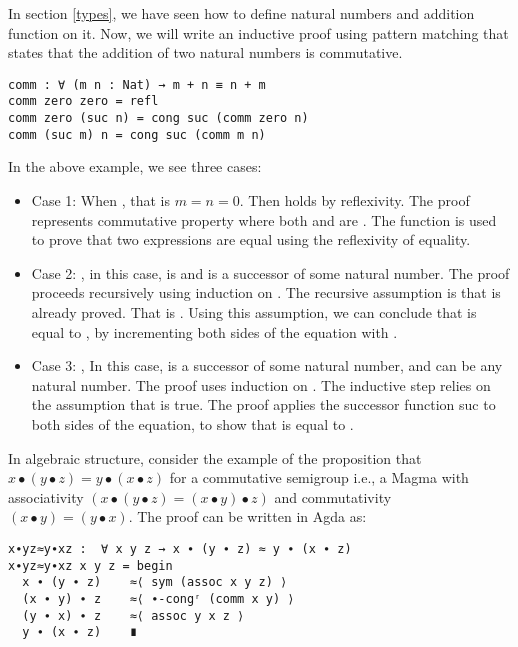 In section \ref{types}, we have seen how to define natural numbers and addition
function on it. Now, we will write an inductive proof using pattern matching
that states that the addition of two natural numbers is commutative.

\begin{verbatim}
comm : ∀ (m n : Nat) → m + n ≡ n + m
comm zero zero = refl
comm zero (suc n) = cong suc (comm zero n)
comm (suc m) n = cong suc (comm m n)
\end{verbatim}

In the above example, we see three cases:
\begin{itemize}
  \item Case 1: When , that is $m = n = 0$. Then
 holds by reflexivity. The proof  represents commutative property where both  and  are
. The  function is used to prove that two expressions
are equal using the reflexivity of equality.
\item Case 2: , in this case,  is 
and  is a successor of some natural number. The proof proceeds
recursively using induction on . The recursive assumption is that
 is already proved. That is .
Using this assumption, we can conclude that  is equal to
, by incrementing both sides of the equation with
.
\item Case 3: , In this case,  is a successor
of some natural number, and  can be any natural number. The proof uses
induction on . The inductive step relies on the assumption that
 is true. The proof applies the successor function suc to both
sides of the equation, to show that  is equal to .
\end{itemize}
In algebraic structure, consider the example of the proposition that $x ∙ (y
∙ z) = y ∙ (x ∙ z)$  for a commutative semigroup i.e., a Magma with
associativity $(x ∙ (y ∙ z) = (x ∙ y) ∙ z)$ and commutativity $(x ∙ y) = (y ∙
x)$. The proof can be written in Agda as:

\begin{verbatim}
x∙yz≈y∙xz :  ∀ x y z → x ∙ (y ∙ z) ≈ y ∙ (x ∙ z)
x∙yz≈y∙xz x y z = begin
  x ∙ (y ∙ z)    ≈⟨ sym (assoc x y z) ⟩
  (x ∙ y) ∙ z    ≈⟨ ∙-congʳ (comm x y) ⟩
  (y ∙ x) ∙ z    ≈⟨ assoc y x z ⟩
  y ∙ (x ∙ z)    ∎
\end{verbatim}

